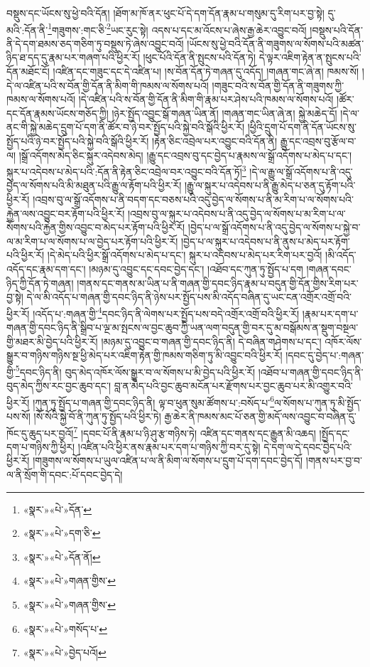 བསྡུས་དང་ཡོངས་སུ་ཕྱེ་བའི་དོན། །ཐོག་མ་ཁོ་ནར་ཕུང་པོ་དེ་དག་དོན་རྣམ་པ་གསུམ་དུ་རིག་པར་བྱ་སྟེ། དུ་མའི་:དོན་ནི་\footnote{«སྣར་»«པེ་»དོན་}གཟུགས་:གང་ཅི་\footnote{«སྣར་»«པེ་»དག་ཅི་}ཡང་རུང་སྟེ། འདས་པ་དང་མ་འོངས་པ་ཞེས་རྒྱ་ཆེར་འབྱུང་བའོ། །བསྡུས་པའི་དོན་ནི་དེ་དག་ཐམས་ཅད་གཅིག་ཏུ་བསྡུས་ཏེ་ཞེས་འབྱུང་བའོ། །ཡོངས་སུ་ཕྱེ་བའི་དོན་ནི་གཟུགས་ལ་སོགས་པའི་མཚན་ཉིད་ཐ་དད་དུ་རྣམ་པར་གཞག་པའི་ཕྱིར་རོ། །ཕུང་པོའི་དོན་ནི་སྤུངས་པའི་དོན་ཏེ། དེ་ལྟར་འཇིག་རྟེན་ན་སྤུངས་པའི་དོན་མཐོང་ངོ། །འཛིན་དང་གཟུང་དང་དེ་འཛིན་པ། །ས་བོན་དོན་ཏེ་གཞན་དུ་འདོད། །གཞན་གང་ཞེ་ན། ཁམས་སོ། །དེ་ལ་འཛིན་པའི་ས་བོན་གྱི་དོན་ནི་མིག་གི་ཁམས་ལ་སོགས་པའོ། །གཟུང་བའི་ས་བོན་གྱི་དོན་ནི་གཟུགས་ཀྱི་ཁམས་ལ་སོགས་པའོ། །དེ་འཛིན་པའི་ས་བོན་གྱི་དོན་ནི་མིག་གི་རྣམ་པར་ཤེས་པའི་ཁམས་ལ་སོགས་པའོ། །ཚོར་དང་དོན་རྣམས་ཡོངས་གཅོད་ཀྱི། །ཉེར་སྤྱོད་འབྱུང་སྒོ་གཞན་ཡིན་ནོ། །གཞན་གང་ཡིན་ཞེ་ན། སྐྱེ་མཆེད་དོ། །དེ་ལ་ནང་གི་སྐྱེ་མཆེད་དྲུག་པོ་དག་ནི་ཚོར་བ་ཉེ་བར་སྤྱོད་པའི་སྐྱེ་བའི་སྒོའི་ཕྱིར་རོ། །ཕྱིའི་དྲུག་པོ་དག་ནི་དོན་ཡོངས་སུ་སྤྱོད་པའི་ཉེ་བར་སྤྱོད་པའི་སྐྱེ་བའི་སྒོའི་ཕྱིར་རོ། །རྟེན་ཅིང་འབྲེལ་པར་འབྱུང་བའི་དོན་ནི། རྒྱུ་དང་འབྲས་བུ་རྩོལ་བ་ལ། །སྒྲོ་འདོགས་མེད་ཅིང་སྐུར་འདེབས་མེད། །རྒྱུ་དང་འབྲས་བུ་དང་བྱེད་པ་རྣམས་ལ་སྒྲོ་འདོགས་པ་མེད་པ་དང་། སྐུར་པ་འདེབས་པ་མེད་པའི་:དོན་ནི་རྟེན་ཅིང་འབྲེལ་བར་འབྱུང་བའི་དོན་ཏོ།\footnote{«སྣར་»«པེ་»དོན་ནོ།} །དེ་ལ་རྒྱུ་ལ་སྒྲོ་འདོགས་པ་ནི་འདུ་བྱེད་ལ་སོགས་པའི་མི་མཐུན་པའི་རྒྱུ་ལ་རྟོག་པའི་ཕྱིར་རོ། །རྒྱུ་ལ་སྐུར་པ་འདེབས་པ་ནི་རྒྱུ་མེད་པ་ཅན་དུ་རྟོག་པའི་ཕྱིར་རོ། །འབྲས་བུ་ལ་སྒྲོ་འདོགས་པ་ནི་བདག་དང་བཅས་པའི་འདུ་བྱེད་ལ་སོགས་པ་ནི་མ་རིག་པ་ལ་སོགས་པའི་རྐྱེན་ལས་འབྱུང་བར་རྟོག་པའི་ཕྱིར་རོ། །འབྲས་བུ་ལ་སྐུར་པ་འདེབས་པ་ནི་འདུ་བྱེད་ལ་སོགས་པ་མ་རིག་པ་ལ་སོགས་པའི་རྐྱེན་གྱིས་འབྱུང་བ་མེད་པར་རྟོག་པའི་ཕྱིར་རོ། །བྱེད་པ་ལ་སྒྲོ་འདོགས་པ་ནི་འདུ་བྱེད་ལ་སོགས་པ་སྐྱེ་བ་ལ་མ་རིག་པ་ལ་སོགས་པ་ལ་བྱེད་པར་རྟོག་པའི་ཕྱིར་རོ། །བྱེད་པ་ལ་སྐུར་པ་འདེབས་པ་ནི་ནུས་པ་མེད་པར་རྟོག་པའི་ཕྱིར་རོ། །དེ་མེད་པའི་ཕྱིར་སྒྲོ་འདོགས་པ་མེད་པ་དང་། སྐུར་པ་འདེབས་པ་མེད་པར་རིག་པར་བྱའོ། །མི་འདོད་འདོད་དང་རྣམ་དག་དང་། །མཉམ་དུ་འབྱུང་དང་དབང་བྱེད་དང་། །འཐོབ་དང་ཀུན་ཏུ་སྤྱོད་པ་དག །གཞན་དབང་ཉིད་ཀྱི་དོན་ཏེ་གཞན། །གནས་དང་གནས་མ་ཡིན་པ་ནི་གཞན་གྱི་དབང་ཉིད་རྣམ་པ་བདུན་གྱི་དོན་གྱིས་རིག་པར་བྱ་སྟེ། དེ་ལ་མི་འདོད་པ་གཞན་གྱི་དབང་ཉིད་ནི་ཉེས་པར་སྤྱོད་པས་མི་འདོད་བཞིན་དུ་ཡང་ངན་འགྲོར་འགྲོ་བའི་ཕྱིར་རོ། །འདོད་པ་:གཞན་གྱི་\footnote{«སྣར་»«པེ་»གཞན་གྱིས་}དབང་ཉིད་ནི་ལེགས་པར་སྤྱོད་པས་བདེ་འགྲོར་འགྲོ་བའི་ཕྱིར་རོ། །རྣམ་པར་དག་པ་གཞན་གྱི་དབང་ཉིད་ནི་སྒྲིབ་པ་ལྔ་མ་སྤངས་ལ་བྱང་ཆུབ་ཀྱི་ཡན་ལག་བདུན་གྱི་བར་དུ་མ་བསྒོམས་ན་སྡུག་བསྔལ་གྱི་མཐར་མི་བྱེད་པའི་ཕྱིར་རོ། །མཉམ་དུ་འབྱུང་བ་གཞན་གྱི་དབང་ཉིད་ནི། དེ་བཞིན་གཤེགས་པ་དང་། འཁོར་ལོས་སྒྱུར་བ་གཉིས་གཉིས་སྔ་ཕྱི་མེད་པར་འཇིག་རྟེན་གྱི་ཁམས་གཅིག་ཏུ་མི་འབྱུང་བའི་ཕྱིར་རོ། །དབང་དུ་བྱེད་པ་:གཞན་གྱི་\footnote{«སྣར་»«པེ་»གཞན་གྱིས་}དབང་ཉིད་ནི། བུད་མེད་འཁོར་ལོས་སྒྱུར་བ་ལ་སོགས་པ་མི་བྱེད་པའི་ཕྱིར་རོ། །འཐོབ་པ་གཞན་གྱི་དབང་ཉིད་ནི་བུད་མེད་ཀྱིས་རང་བྱང་ཆུབ་དང་། བླ་ན་མེད་པའི་བྱང་ཆུབ་མངོན་པར་རྫོགས་པར་བྱང་ཆུབ་པར་མི་འགྱུར་བའི་ཕྱིར་རོ། །ཀུན་ཏུ་སྤྱོད་པ་གཞན་གྱི་དབང་ཉིད་ནི། ལྟ་བ་ཕུན་སུམ་ཚོགས་པ་:བསོད་པ་\footnote{«སྣར་»«པེ་»གསོད་པ་}ལ་སོགས་པ་ཀུན་ཏུ་མི་སྤྱོད་པས་སོ། །སོ་སོའི་སྐྱེ་བོ་ནི་ཀུན་ཏུ་སྤྱོད་པའི་ཕྱིར་ཏེ། རྒྱ་ཆེར་ནི་ཁམས་མང་པོ་ཅན་གྱི་མདོ་ལས་འབྱུང་བ་བཞིན་དུ་ཁོང་དུ་ཆུད་པར་བྱའོ།\footnote{«སྣར་»«པེ་»བྱེད་པའོ།} །དབང་པོ་ནི་རྣམ་པ་ཉི་ཤུ་རྩ་གཉིས་ཏེ། འཛིན་དང་གནས་དང་རྒྱུན་མི་འཆད། །སྤྱོད་དང་དག་པ་གཉིས་ཀྱི་ཕྱིར། །འཛིན་པའི་ཕྱིར་ནས་རྣམ་པར་དག་པ་གཉིས་ཀྱི་བར་དུ་སྟེ། དེ་དག་ལ་དེ་དབང་བྱེད་པའི་ཕྱིར་རོ། །གཟུགས་ལ་སོགས་པ་ཡུལ་འཛིན་པ་ལ་ནི་མིག་ལ་སོགས་པ་དྲུག་པོ་དག་དབང་བྱེད་དོ། །གནས་པར་བྱ་བ་ལ་ནི་སྲོག་གི་དབང་:པོ་དབང་བྱེད་དེ། 
